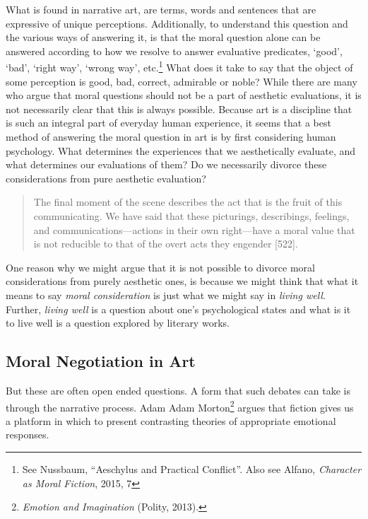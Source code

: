 \documentclass[phdthesis,12pt,final]{wuthesis}
\theoremstyle{definition}
\theoremstyle{definition}
\theoremstyle{definition}
\theoremstyle{definition}
\theoremstyle{remark}
\begin{document}
What is found in narrative art, are terms, words and sentences that are expressive of unique perceptions. Additionally, to understand this question and the various ways of answering it, is that the moral question alone can be answered according to how we resolve to answer evaluative predicates, `good', `bad', `right way', `wrong way', etc.\footnote{See Nussbaum, {``Aeschylus and Practical Conflict''}. Also see Alfano, \emph{Character as Moral Fiction}, 2015, 7} What does it take to say that the object of some perception is good, bad, correct, admirable or noble? While there are many who argue that moral questions should not be a part of aesthetic evaluations, it is not necessarily clear that this is always possible. Because art is a discipline that is such an integral part of everyday human experience, it seems that a best method of answering the moral question in art is by first considering human psychology. What determines the experiences that we aesthetically evaluate, and what determines our evaluations of them? Do we necessarily divorce these considerations from pure aesthetic evaluation?

\begin{quote}
The final moment of the scene describes the act that is the fruit of this communicating. We have said that these picturings, describings, feelings, and communications---actions in their own right---have a moral value that is not reducible to that of the overt acts they engender {[}522{]}.
\end{quote}

One reason why we might argue that it is not possible to divorce moral considerations from purely aesthetic ones, is because we might think that what it means to say \emph{moral consideration} is just what we might say in \emph{living well}. Further, \emph{living well} is a question about one's psychological states and what is it to live well is a question explored by literary works.

\subsection*{Moral Negotiation in Art}\label{moral-negotiation-in-art}

But these are often open ended questions. A form that such debates can take is through the narrative process. Adam Adam Morton\footnote{\emph{Emotion and {Imagination}} (Polity, 2013).} argues that fiction gives us a platform in which to present contrasting theories of appropriate emotional responses.
\end{document}
